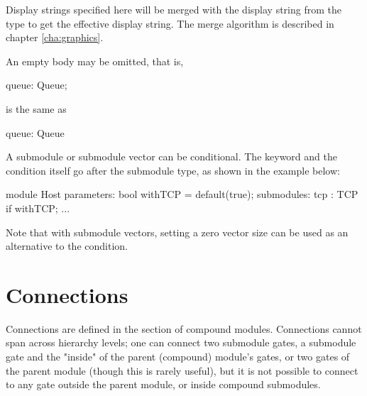 Display strings specified here will be merged with the display string
from the type to get the effective display string. The merge algorithm is
described in chapter \ref{cha:graphics}.


An empty body may be omitted, that is,

\begin{ned}
      queue: Queue;
\end{ned}

is the same as

\begin{ned}
      queue: Queue {
      }
\end{ned}

A submodule or submodule vector can be conditional. The 
keyword and the condition itself go after the submodule type, as shown in the
example below:

\begin{ned}
module Host
{
    parameters:
        bool withTCP = default(true);
    submodules:
        tcp : TCP if withTCP;
        ...
}
\end{ned}

Note that with submodule vectors, setting a zero vector size can be used as an
alternative to the  condition.

\section{Connections}
\label{sec:ned-lang:connections}

Connections are defined in the  section of compound
modules. Connections cannot span across hierarchy levels; one can connect
two submodule gates, a submodule gate and the "inside" of the parent
(compound) module's gates, or two gates of the parent module (though this
is rarely useful), but it is not possible to connect to any gate outside the
parent module, or inside compound submodules.

